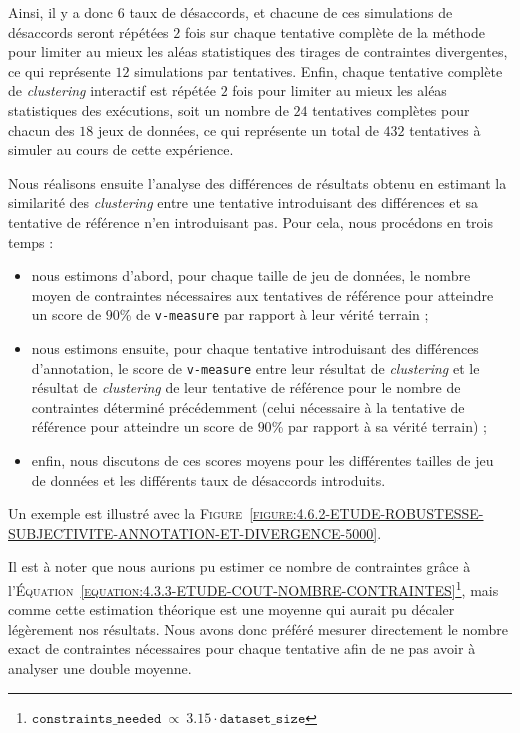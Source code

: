 			Ainsi, il y a donc $6$ taux de désaccords, et chacune de ces simulations de désaccords seront répétées $2$ fois sur chaque tentative complète de la méthode pour limiter au mieux les aléas statistiques des tirages de contraintes divergentes, ce qui représente $12$ simulations par tentatives.
			Enfin, chaque tentative complète de \textit{clustering} interactif est répétée $2$ fois pour limiter au mieux les aléas statistiques des exécutions, soit un nombre de $24$ tentatives complètes pour chacun des $18$ jeux de données, ce qui représente un total de $432$ tentatives à simuler au cours de cette expérience.
			
			Nous réalisons ensuite l'analyse des différences de résultats obtenu en estimant la similarité des \textit{clustering} entre une tentative introduisant des différences et sa tentative de référence n'en introduisant pas.
			Pour cela, nous procédons en trois temps :
			\begin{itemize}
				\item nous estimons d'abord, pour chaque taille de jeu de données, le nombre moyen de contraintes nécessaires aux tentatives de référence pour atteindre un score de $90$\% de \texttt{v-measure} par rapport à leur vérité terrain ;
				\item nous estimons ensuite, pour chaque tentative introduisant des différences d'annotation, le score de \texttt{v-measure} entre leur résultat de \textit{clustering} et le résultat de \textit{clustering} de leur tentative de référence pour le nombre de contraintes déterminé précédemment (celui nécessaire à la tentative de référence pour atteindre un score de $90$\% par rapport à sa vérité terrain) ;
				\item enfin, nous discutons de ces scores moyens pour les différentes tailles de jeu de données et les différents taux de désaccords introduits.
			\end{itemize}
			Un exemple est illustré avec la \textsc{Figure~\ref{figure:4.6.2-ETUDE-ROBUSTESSE-SUBJECTIVITE-ANNOTATION-ET-DIVERGENCE-5000}}.
			
			\begin{leftBarAuthorOpinion}
				Il est à noter que nous aurions pu estimer ce nombre de contraintes grâce à l'\textsc{Équation~\ref{equation:4.3.3-ETUDE-COUT-NOMBRE-CONTRAINTES}}\footnote{
					$\texttt{constraints\_needed}~\propto~3.15 \cdot \texttt{dataset\_size}$
				}, mais comme cette estimation théorique est une moyenne qui aurait pu décaler légèrement nos résultats.
				Nous avons donc préféré mesurer directement le nombre exact de contraintes nécessaires pour chaque tentative afin de ne pas avoir à analyser une double moyenne.
			\end{leftBarAuthorOpinion}
			
